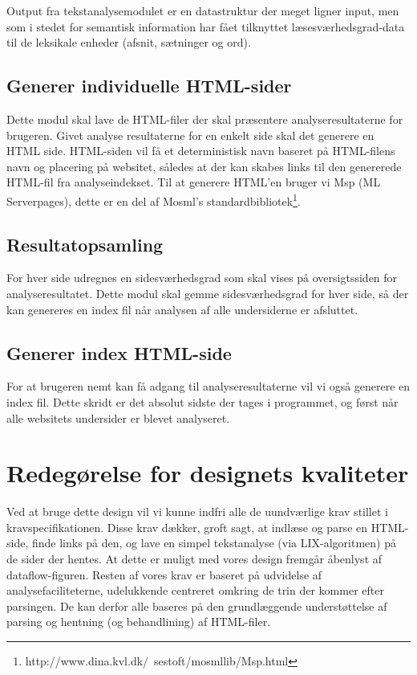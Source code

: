 \documentclass[a4paper,oneside,article, titlepage]{article}
\begin{document}
Output fra tekstanalysemodulet er en datastruktur der meget ligner
input, men som i stedet for semantisk information har fået tilknyttet
læsesværhedsgrad-data til de leksikale enheder (afsnit, sætninger og
ord).

\subsection{Generer individuelle HTML-sider}
Dette modul skal lave de HTML-filer der skal præsentere
analyseresultaterne for brugeren. Givet analyse resultaterne for en
enkelt side skal det generere en HTML side. HTML-siden vil få et
deterministisk navn baseret på HTML-filens navn og placering på
websitet, således at der kan skabes links til den genererede HTML-fil
fra analyseindekset. Til at generere HTML'en bruger vi Msp (ML
Serverpages), dette er en del af Mosml's
standardbibliotek\footnote{http://www.dina.kvl.dk/~sestoft/mosmllib/Msp.html}.

\subsection{Resultatopsamling}
For hver side udregnes en sidesværhedsgrad som skal vises på
oversigtssiden for analyseresultatet. Dette modul skal gemme
sidesværhedsgrad for hver side, så der kan genereres en index fil når
analysen af alle undersiderne er afsluttet.

\subsection{Generer index HTML-side}
For at brugeren nemt kan få adgang til analyseresultaterne vil vi også
generere en index fil. Dette skridt er det absolut sidste der tages i
programmet, og først når alle websitets undersider er blevet
analyseret. 


\section{Redegørelse for designets kvaliteter}
Ved at bruge dette design vil vi kunne indfri alle de uundværlige krav
stillet i kravspecifikationen. Disse krav dækker, groft sagt, at
indlæse og parse en HTML-side, finde links på den, og lave en simpel
tekstanalyse (via LIX-algoritmen) på de sider der hentes. At dette er
muligt med vores design fremgår åbenlyst af dataflow-figuren. Resten
af vores krav er baseret på udvidelse af analysefaciliteterne,
udelukkende centreret omkring de trin der kommer efter parsingen. De
kan derfor alle baseres på den grundlæggende understøttelse af parsing
og hentning (og behandlining) af HTML-filer.
\end{document}
